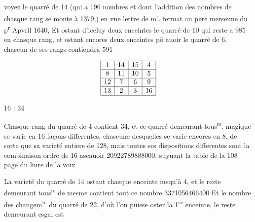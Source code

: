 \documentclass[11pt,a4paper]{article}
\begin{document}


voyez le quarré de 14 (qui a 196 nombres et dont l'addition des nombres de chasque rang se monte à 1379,)  en vne lettre de m\textsuperscript{r}. fermat  au pere mersenne du p\textsuperscript{r} \ill{} Apvril 1640, Et ostant d'iceluy deux enceintes le quarré de 10 qui reste a 985 en chasque rang, et ostant encores deux enceintes pō auoir le quarré de 6. chascun de ses rangs contiendra 591

\[
\begin{array}{|c|c|c|c|}
\hline
1 & 14 & 15 & 4 \\
\hline
8 & 11 & 10 & 5 \\
\hline
12 & 7 & 6 & 9 \\
\hline
13 & 2 & 3 & 16 \\
\hline
\end{array}
\]

16 : 34

Chasque rang du quarré de 4 contient 34, et ce quarré demeurant tous\textsuperscript{rs}. magique se varie en 16 façons differentes, chascune desquelles se varie encores en 8, de sorte que sa varieté entiere  de 128, mais toutes ses dispositions differentes sont la combinaison ordre de 16 ascauoir 20922789888000, suyuant la table de la 108 page du liure de la voix

La varieté du quarré de 14 ostant chasque enceinte iusqu'à 4, et le reste demeurant tous\textsuperscript{rs} de mesme contient tout ce nombre 3371056466400 Et le nombre des changem\textsuperscript{ts} du quarré de 22, d'où l'on puisse oster la 1\textsuperscript{re} enceinte, le reste demeurant esgal est
\end{document}
